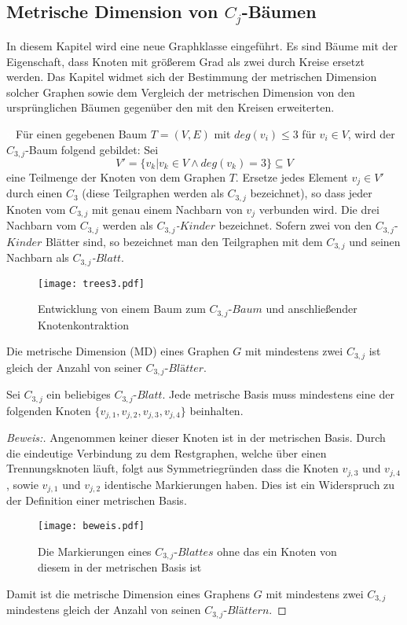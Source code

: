 \subsection{Metrische Dimension von $C_j$-Bäumen}
In diesem Kapitel wird eine neue Graphklasse eingeführt. Es sind Bäume mit der Eigenschaft, dass Knoten mit größerem Grad als zwei durch Kreise ersetzt werden. Das Kapitel widmet sich der Bestimmung der metrischen Dimension solcher Graphen sowie dem Vergleich der metrischen Dimension von den ursprünglichen Bäumen gegenüber den mit den Kreisen erweiterten. 
\begin{defi}
\label{C_{3,j} tree}
\textcolor{white}{x}
Für einen gegebenen Baum $T=(V,E)$ mit $deg(v_i)\leq 3$ für $v_i \in V$, wird der $C_{3,j}$-Baum folgend gebildet:
   Sei $$V'=\{v_k|v_k \in V \wedge deg(v_k)=3\}\subseteq V$$ eine Teilmenge der Knoten von dem Graphen $T$. Ersetze jedes Element $v_j \in V'$ durch einen $C_3$ (diese Teilgraphen werden als \emph{$C_{3,j}$} bezeichnet), so dass jeder Knoten vom $C_{3,j}$ mit genau einem Nachbarn von $v_j$ verbunden wird. Die drei Nachbarn vom $C_{3,j}$ werden als \emph{$C_{3,j}$-$Kinder$} bezeichnet. Sofern zwei von den $C_{3,j}$-$Kinder$ Blätter sind, so bezeichnet man den Teilgraphen mit dem $C_{3,j}$ und seinen Nachbarn als \emph{$C_{3,j}$-$Blatt$}.
   \end{defi}
\begin{bsp}

\clearpage
\begin{figure}[h!]
		\centering 		 
   \texttt{[image: trees3.pdf]}
	\caption{Entwicklung von einem Baum zum $C_{3,j}$-$Baum$ und anschließender Knotenkontraktion}
  	 \end{figure}
\end{bsp}
Die metrische Dimension (MD) eines Graphen $G$ mit mindestens zwei $C_{3,j}$ ist gleich der Anzahl von seiner $C_{3,j}$-$Blätter$.
\begin{lem}
Sei $C_{3,j}$ ein beliebiges $C_{3,j}$-$Blatt$. Jede metrische Basis muss mindestens eine der folgenden Knoten $\{v_{j,1},v_{j,2},v_{j,3},v_{j,4}\}$ beinhalten.
\end{lem}
\begin{proof}[Beweis:]
Angenommen keiner dieser Knoten ist in der metrischen Basis. Durch die eindeutige Verbindung zu dem Restgraphen, welche über einen Trennungsknoten läuft, folgt aus Symmetriegründen dass die Knoten $v_{j,3}$ und $v_{j,4}$, sowie $v_{j,1}$ und $v_{j,2}$ identische Markierungen haben. Dies ist ein Widerspruch zu der Definition einer metrischen Basis.

\clearpage
\begin{figure}[h!]
		\centering 		 
	\texttt{[image: beweis.pdf]}
	\caption{Die Markierungen eines $C_{3,j}$-$Blattes$ ohne das ein Knoten von diesem in der metrischen Basis ist}
  	 \end{figure}
Damit ist die metrische Dimension eines Graphens $G$ mit mindestens zwei $C_{3,j}$ mindestens gleich der Anzahl von seinen $C_{3,j}$-$Blättern$.
\end{proof}
